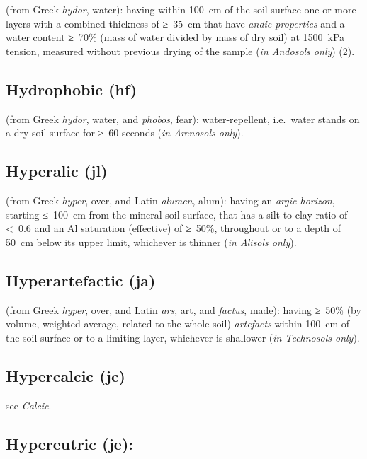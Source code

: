 \documentclass[
  letterpaper,
  DIV=11,
  numbers=noendperiod]{scrreprt}
\begin{document}
(from Greek \emph{hydor}, water): having within 100~cm of the soil
surface one or more layers with a combined thickness of ≥~35~cm that
have \emph{andic properties} and a water content ≥~70\% (mass of water
divided by mass of dry soil) at 1500~kPa tension, measured without
previous drying of the sample (\emph{in Andosols only}) (2).

\hypertarget{hydrophobic-hf}{%
\subsection{Hydrophobic (hf)}\label{hydrophobic-hf}}

(from Greek \emph{hydor}, water, and \emph{phobos}, fear):
water-repellent, i.e.~water stands on a dry soil surface for ≥~60
seconds (\emph{in Arenosols only}).

\hypertarget{hyperalic-jl}{%
\subsection{Hyperalic (jl)}\label{hyperalic-jl}}

(from Greek \emph{hyper}, over, and Latin \emph{alumen}, alum): having
an \emph{argic horizon}, starting ≤~100~cm from the mineral soil
surface, that has a silt to clay ratio of \textless~0.6 and an Al
saturation (effective) of ≥~50\%, throughout or to a depth of 50~cm
below its upper limit, whichever is thinner (\emph{in Alisols only}).

\hypertarget{hyperartefactic-ja}{%
\subsection{Hyperartefactic (ja)}\label{hyperartefactic-ja}}

(from Greek \emph{hyper}, over, and Latin \emph{ars}, art, and
\emph{factus}, made): having ≥~50\% (by volume, weighted average,
related to the whole soil) \emph{artefacts} within 100~cm of the soil
surface or to a limiting layer, whichever is shallower (\emph{in
Technosols only}).

\hypertarget{hypercalcic-jc-1}{%
\subsection{Hypercalcic (jc)}\label{hypercalcic-jc-1}}

see \emph{Calcic}.

\hypertarget{hypereutric-je-1}{%
\subsection{Hypereutric (je):}\label{hypereutric-je-1}}
\end{document}

